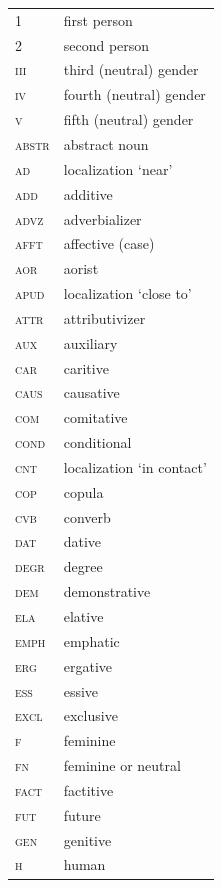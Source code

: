 \documentclass[output=paper,colorlinks=true, citecolor=brown]{langscibook}
\begin{document}
\begin{tabularx}{.45\textwidth}{lQ}
{\scshape 1} & first person\\
{\scshape 2} & second person\\
{\scshape iii} &  third (neutral) gender \\
{\scshape iv} & fourth (neutral) gender \\
{\scshape v} & fifth (neutral) gender \\
{\scshape abstr} & abstract noun\\
{\scshape ad} & localization ‘near’ \\
{\scshape add} & additive \\
{\scshape advz} & adverbializer \\
{\scshape afft} & affective (case) \\
{\scshape aor} & aorist \\
{\scshape apud} & localization ‘close to’ \\ 
{\scshape attr} & attributivizer \\
{\scshape aux} & auxiliary \\
{\scshape car} & caritive \\
{\scshape caus} & causative \\
{\scshape com} & comitative \\
{\scshape cond} & conditional \\
{\scshape cnt} & localization ‘in contact’ \\
{\scshape cop} & copula \\
{\scshape cvb} & converb \\
{\scshape dat} & dative \\
{\scshape degr} & degree  \\
{\scshape dem} & demonstrative \\
{\scshape ela} & elative \\
{\scshape emph} & emphatic \\
{\scshape erg} & ergative \\
{\scshape ess} & essive  \\
{\scshape excl} & exclusive  \\
{\scshape f} & feminine \\
{\scshape fn} & feminine or neutral \\
{\scshape fact} & factitive \\
{\scshape fut} & future \\
{\scshape gen} & genitive \\
{\scshape h} & human \\
\end{tabularx}
\end{document}
